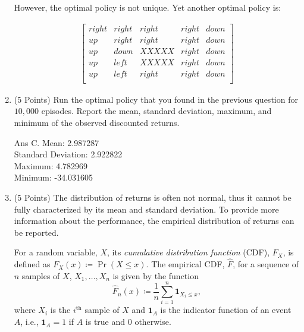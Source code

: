 \documentclass[]{article}
\begin{document}
\begin{enumerate}[label=\Alph*]
{		However, the optimal policy is not unique. Yet another optimal policy is:

		
		\begin{align}
		        \begin{bmatrix}
		        right&    right&    right&    right&     down     \\
		    up&    right&    right&    right&     down     \\
		    up&       down&       XXXXX&    right&     down     \\
		    up&       left&       XXXXX&    right&     down \\
		    up&       left&       right&    right&    down\\
		        \end{bmatrix}
	    \end{align}
	}

    \item (5 Points) Run the optimal policy that you found in the previous question for $10,\!000$ episodes. Report the mean, standard deviation, maximum, and minimum of the observed discounted returns.

	{
		\color{blue}
			Ans C. Mean: 2.987287 \\
				Standard Deviation: 2.922822 \\
				Maximum: 4.782969 \\
				Minimum: -34.031605 \\
	}

    \item (5 Points) The distribution of returns is often not normal, thus it cannot be fully characterized by its mean and standard deviation. To provide more information about the performance, the empirical distribution of returns can be reported.
    
    For a random variable, $X$, its \textit{cumulative distribution function} (CDF), $F_X$, is defined as $F_X(x) \coloneqq \Pr(X \le x)$. The empirical CDF, $\hat F$, for a sequence of $n$ samples of $X$, $X_1,\dotsc,X_n$ is given by the function
    \begin{equation*}
        \hat F_n(x) \coloneqq \frac{1}{n} \sum_{i=1}^n \mathbf{1}_{X_i \le x},
    \end{equation*}
    where $X_i$ is the $i^\text{th}$ sample of $X$ and $\mathbf{1}_A$ is the indicator function of an event $A$, i.e., $\mathbf{1}_A=1$ if $A$ is true and $0$ otherwise. 
    

\end{enumerate}
\end{document}
